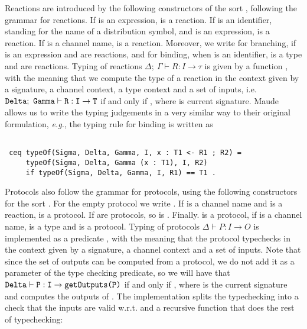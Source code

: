 Reactions are introduced by the following constructors of the sort
, following the grammar for reactions. If  is an expression,  is a reaction. If  is an identifier, standing for the name of a
distribution symbol, and  is an expression,  
is a reaction. If  is a channel name,  is a reaction.
Moreover, we write  for branching, if  is an expression and  are reactions, and  for binding, when  is an identifier,  is a type and 
 are reactions.
Typing of reactions $\Delta; \ \Gamma \vdash R : I \to \tau$ is given by a function
, 
with the meaning that
we compute the type of a reaction in the context given by a signature, a channel context, a type context and a set of inputs, 
i.e. $\texttt{Delta}; \ \texttt{Gamma} \vdash \texttt{R} : \texttt{I} \to \texttt{T}$ 
if and only if 
, where  is 
current signature. 
Maude allows us to write the typing
judgements in a very similar way to their original formulation, \emph{e.g.}, the typing rule for binding is written as
\begin{lstlisting}

 ceq typeOf(Sigma, Delta, Gamma, I, x : T1 <- R1 ; R2) = 
     typeOf(Sigma, Delta, Gamma (x : T1), I, R2)
     if typeOf(Sigma, Delta, Gamma, I, R1) == T1 .

\end{lstlisting}

Protocols also follow the grammar for protocols, using the following
constructors for the sort . For the empty protocol we write
. If  is a channel name and  is a 
reaction,  is a protocol. If  are protocols,
so is . Finally.  is a protocol,
if  is a channel name,  is a type and  is a protocol. Typing of protocols $\Delta \vdash P : I \to O$ is implemented as a predicate
, with the meaning that the protocol typechecks 
in the context given by a signature, a channel context and a set of inputs.
Note that since the set of outputs can be computed from a protocol, we
do not add it as a parameter of the type checking predicate, so we will have that
$\texttt{Delta} \vdash \texttt{P} : \texttt{I} \to \texttt{getOutputs(P)}$ 
if and only if
,
where  is the current signature and
 computes the outputs of .
The implementation splits the typechecking into a check that the inputs are valid w.r.t.  and a recursive function that does the rest of typechecking:

